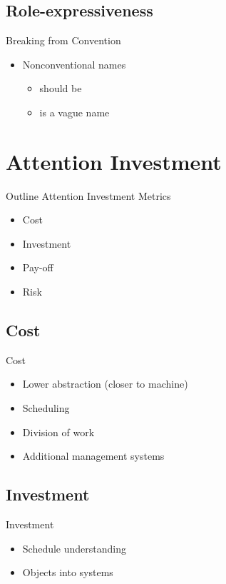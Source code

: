 \subsection{Role-expressiveness}
\begin{frame}{\secname}{\subsecname}
	Breaking from Convention
	\begin{itemize}
		\item<2-> Nonconventional names
		\begin{itemize}
			\item<3->  should be 
			\item<4->  is a vague name
		\end{itemize}
	\end{itemize}
\end{frame}

\section{Attention Investment}
\begin{frame}{\secname}{Outline}
	Attention Investment Metrics
	\begin{itemize}
		\item Cost
		\item Investment
		\item Pay-off
		\item Risk
	\end{itemize}
\end{frame}

\subsection{Cost}
\begin{frame}{\secname}{\subsecname}
	Cost
	\begin{itemize}
		\item<2-> Lower abstraction (closer to machine)
		\item<3-> Scheduling
		\item<4-> Division of work
		\item<5-> Additional management systems
	\end{itemize}
\end{frame}

\subsection{Investment}
\begin{frame}{\secname}{\subsecname}
	Investment
	\begin{itemize}
		\item<2-> Schedule understanding
		\item<3-> Objects into systems
	\end{itemize}
\end{frame}

